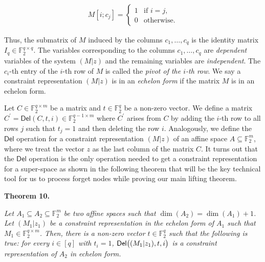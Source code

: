 \[\begin{gathered}
M[i;c_{j}]=\begin{cases}1&\text{if $i=j$},\\
0&\text{otherwise}.\end{cases}
\end{gathered}\]


Thus, the submatrix of $M$ induced by the columns $c_{1},\dots,c_{q}$ is the identity matrix $I_{q}\in\mathbb{F}_{2}^{q\times q}$.
The variables corresponding to the columns $c_{1},\dots,c_{q}$ are \emph{dependent} variables of the system $(M|z)$ and the remaining variables are \emph{independent}.
The $c_{i}$-th entry of the $i$-th row of $M$ is called the \emph{pivot of the $i$-th row}.
We say a constraint representation $(M|z)$ is in an \emph{echelon form} if the matrix $M$ is in an echelon form.\par




Let $C\in\mathbb{F}_{2}^{q\times m}$ be a matrix and $t\in\mathbb{F}_{2}^{q}$ be a non-zero vector.
We define a matrix $C^{\prime}=\mathsf{Del}(C,t,i)\in\mathbb{F}_{2}^{q-1\times m}$ where $C^{\prime}$ arises from $C$ by adding the $i$-th row to all rows $j$ such that $t_{j}=1$ and then deleting the row $i$.
Analogously, we define the $\mathsf{Del}$ operation for a constraint representation $(M|z)$ of an affine space $A\subseteq\mathbb{F}_{2}^{m}$, where we treat the vector $z$ as the last column of the matrix $C$.
It turns out that the $\mathsf{Del}$ operation is the only operation needed to get a constraint representation for a super-space as shown in the following theorem that will be the key technical tool for us to process forget nodes while proving our main lifting theorem.\par





\par\medskip\noindent\textbf{
\textbf{Theorem 10}\textbf{.}
}\par



\emph{Let $A_{1}\subseteq A_{2}\subseteq\mathbb{F}_{2}^{m}$ be two affine spaces such that $\dim(A_{2})=\dim(A_{1})+1$.
Let $(M_{1}|z_{1})$ be a constraint representation in the echelon form of $A_{1}$ such that $M_{1}\in\mathbb{F}_{2}^{q\times m}$.
Then, there is a non-zero vector $t\in\mathbb{F}_{2}^{q}$ such that the following is true: for every $i\in[q]$ with $t_{i}=1$, $\mathsf{Del}\bigl{(}(M_{1}|z_{1}),t,i\bigr{)}$ is a constraint representation of $A_{2}$ in echelon form.}\par



